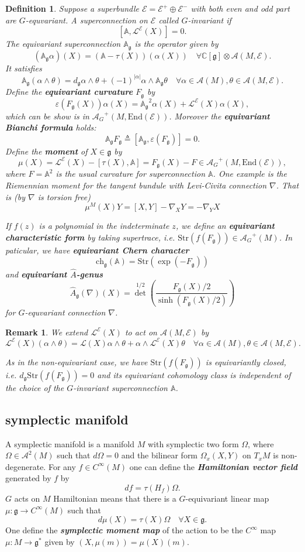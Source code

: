 \documentclass[11pt]{amsart}
\newtheorem{Def}[Thm]{Definition}
\newtheorem{Rmk}[Thm]{Remark}
\def\cA{{\mathcal{A}}}
\def\cAg{{\mathcal{A}_G}}
\def\cL{{\mathcal{L}}}
\def\cLE{\cL^\cE}
\def\cE{{\mathcal{E}}}
\def\bC{{\mathbb{C}}}
\def\bA{{\mathbb{A}}}
\def\bAg{{\mathbb{A}_\mathfrak{g}}}
\def\Fg{{F_{\fgg}}}
\def\fgg{{\mathfrak{g}}}
\def\dg{{d_{\fgg}}}
\def\End{{\mathrm{End}}}
\def\Str{{\mathrm{Str}}}
\def\kw#1{{\bf \em #1}}
\def\ch{\mathrm{ch}}
\def\Ah{{\hat{A}}}
\def\chg{\ch_\fgg}
\def\Ahg{\Ah_\fgg}
\begin{document}
\begin{Def}
Suppose a superbundle $\cE = \cE^+\oplus \cE^-$ 
with both even and odd part are $G$-equvariant.
A superconnection on $\cE$ called $G$-invariant if 
\[
[\bA,\cL^\cE(X)]=0.
\]
The equivariant superconnection $\bAg$ is the operator given by 
\[
(\bAg \alpha)(X) = (\bA-\tau(X))(\alpha(X)) \quad \forall  \bC[\fgg]\otimes \cA(M,\cE).
\]
It satisfies \[
\bAg(\alpha\wedge \theta) = \dg \alpha \wedge \theta +
(-1)^{|\alpha|}\alpha\wedge \bAg\theta \quad \forall\alpha \in \cA(M),
\theta \in \cA(M,\cE).
\]
Define the \kw{equivariant curvature} $\Fg$ by
\[
\varepsilon(\Fg(X))\alpha(X) = \bAg^2\alpha(X) + \cL^\cE(X)\alpha(X),
\] 
which can be show is in $\cAg^+(M,\End(\cE))$.
Moreover the \kw{equivariant Bianchi formula} holds:
\[
\bAg\Fg \triangleq [\bAg,\varepsilon(\Fg)] = 0.
\]
Define the \kw{moment} of $X\in \fgg$ by 
\[
\mu(X) = \cLE(X) - [\tau(X),\bA] = \Fg(X) - F \in \cAg^+(M,\End(\cE)),
\]
where $F = \bA^2$ is the usual curvature for superconnection $\bA$.
One example is the Riemennian moment for the tangent bundule with Levi-Civita connection $\nabla$.
That is (by $\nabla$ is torsion free)
\begin{equation}\label{eq:Rm}
\mu^M(X)Y = [X,Y] - \nabla_X Y = -\nabla_Y X
\end{equation}

If $f(z)$ is a polynomial in the indeterminate $z$, we define an
\kw{equivariant characteristic form} by taking supertrace,
i.e. $\Str(f(\Fg)) \in \cAg^+(M)$. In paticular, we have
\kw{equivariant Chern character} 
\[\chg(\bA) = \Str(\exp(-\Fg))
\]
 and
\kw{equivariant $\Ah$-genus} 
\[
\Ahg(\nabla)(X) =
{\det}^{1/2}\left(\frac{\Fg(X)/2}{\sinh(\Fg(X)/2)}\right)
\]
for $G$-equvariant connection $\nabla$.
\end{Def}

\begin{Rmk}
We extend $\cL^\cE(X)$ to act on $\cA(M,\cE)$ by 
\[
\cLE(X)(\alpha\wedge \theta) =\cL(X) \alpha \wedge \theta +\alpha
\wedge \cLE(X)\theta \quad \forall \alpha\in \cA(M), \theta\in \cA(M,\cE).
\]

As in the non-equivariant case, we have $\Str(f(\Fg))$ is
equivariantly closed, i.e. $\dg \Str(f(\Fg)) = 0$ and its equivariant
cohomology class is independent of the choice of the $G$-invariant
superconnection $\bA$.
\end{Rmk}


\subsection{symplectic manifold}
A symplectic manifold is a manifold $M$ with symplectic two form
$\Omega$, where $\Omega\in \cA^2(M)$ such that $d\Omega=0$ and
the bilinear form $\Omega_x(X,Y)$ on $T_xM$ is non-degenerate.
For any $f\in C^\infty(M)$ one can define the \kw{Hamiltonian vector
  field} generated by $f$ by 
\[
df = \tau(H_f)\Omega.
\] 
$G$ acts on $M$ Hamiltonian means that there is a $G$-equivariant linear
map $\mu:\fgg\to C^\infty(M)$ such that 
\[
d\mu(X) = \tau(X) \Omega \quad \forall X\in \fgg.
\]
One define the \kw{symplectic moment map} of the action to be the
$C^\infty$ map $\mu\colon M\to \fgg^*$ given by $(X,\mu(m)) =
\mu(X)(m)$.
\end{document}
